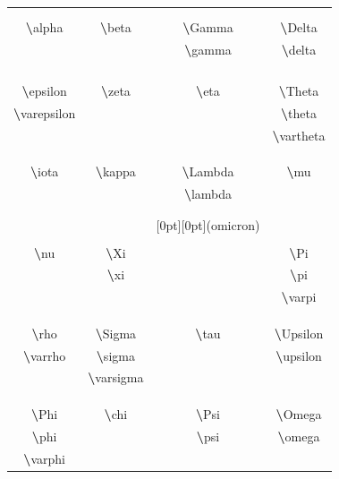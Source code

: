 \documentclass{article}
\newcommand{\gl}[1]{\scalebox{5.5}{\ensuremath{#1}}}
\newcommand{\bs}[1]{{\LARGE \textbf{\textbackslash}#1}}
\begin{document}
	\begin{center}
	\end{center}
	\setlength{\tabcolsep}{20pt}
	\begin{table}[H]
		\centering
		\begin{tabular}{cccc}
			\gl\alpha & \gl\beta & \gl{\Gamma\gamma} & \gl{\Delta\delta} \\
			&&&\\[-6pt]
			\bs{alpha} & \bs{beta}  & \bs{Gamma} & \bs{Delta} \\
			& & \bs{gamma} & \bs{delta} \\
			&&&\\
			&&&\\
			\gl{\epsilon\varepsilon} & \gl\zeta & \gl\eta & \gl{\Theta\theta\vartheta} \\
			&&&\\[-6pt]
			\bs{epsilon} & \bs{zeta} & \bs{eta} & \bs{Theta} \\
			\bs{varepsilon} & & & \bs{theta} \\
			& & & \bs{vartheta} \\
			&&&\\
			\gl\iota & \gl\kappa & \gl{\Lambda\lambda} & \gl\mu \\
			&&&\\[-6pt]
			\bs{iota} & \bs{kappa} & \bs{Lambda} & \bs{mu} \\
			& & \bs{lambda} &  \\
			&&&\\
			&&&\\
			\gl\nu & \gl{\Xi\xi} & \raisebox{1.4em}[0pt][0pt]{\LARGE(omicron)} & \gl{\Pi\pi\varpi} \\
			&&&\\[-6pt]
			\bs{nu} & \bs{Xi} &  & \bs{Pi} \\
			& \bs{xi} & & \bs{pi} \\
			& & & \bs{varpi} \\
			&&&\\
			\gl{\rho\varrho} & \gl{\Sigma\sigma\varsigma} & \gl\tau & \gl{\Upsilon\upsilon} \\
			&&&\\[-6pt]
			\bs{rho} & \bs{Sigma} & \bs{tau} & \bs{Upsilon} \\
			\bs{varrho} & \bs{sigma} & & \bs{upsilon} \\
			& \bs{varsigma} & & \\
			&&&\\
			\gl{\Phi\phi\varphi} & \gl\chi & \gl{\Psi\psi} & \gl{\Omega\omega} \\
			&&&\\[-6pt]
			\bs{Phi} & \bs{chi} & \bs{Psi} & \bs{Omega} \\
			\bs{phi} &  & \bs{psi} & \bs{omega} \\
			\bs{varphi} & & & \\
		\end{tabular}
	\end{table}
\end{document}
